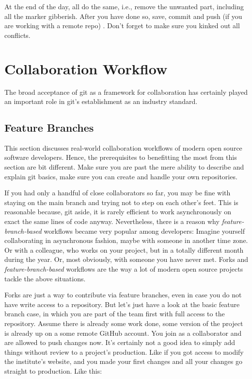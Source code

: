 \documentclass[
  12pt,
  letterpaper,
]{krantz}
\begin{document}
At the end of the day, all do the same, i.e., remove the unwanted part,
including all the marker gibberish. After you have done so, save, commit
and push (if you are working with a remote repo) . Don't forget to make
sure you kinked out all conflicts.

\hypertarget{collaboration-workflow}{%
\section{Collaboration Workflow}\label{collaboration-workflow}}

The broad acceptance of git as a framework for collaboration has
certainly played an important role in git's establishment as an industry
standard.

\hypertarget{feature-branches}{%
\subsection{Feature Branches}\label{feature-branches}}

This section discusses real-world collaboration
workflows of modern open source software developers. Hence, the
prerequisites to benefitting the most from this section are bit
different. Make sure you are past the mere ability to describe and
explain git basics, make sure you can create and handle your own
repositories.

If you had only a handful of close collaborators so far, you may be fine
with staying on the main branch and trying not to step on each other's
feet. This is reasonable because, git aside, it is rarely efficient to
work asynchronously on exact the same lines of code anyway.
Nevertheless, there is a reason why
\emph{feature-branch-based} workflows became very
popular among developers: Imagine yourself collaborating in asynchronous
fashion, maybe with someone in another time zone. Or with a colleague,
who works on your project, but in a totally different month during the
year. Or, most obviously, with someone you have never met. Forks and
\emph{feature-branch-based} workflows are the way a lot of modern open
source projects tackle the above situations.

Forks are just a way to contribute via feature
branches, even in case you do not have write
access to a repository. But let's just have a look at the basic feature
branch case, in which you are part of the team first with full access to
the repository. Assume there is already some work done, some version of
the project is already up on a some remote GitHub account. You join as a
collaborator and are allowed to push changes now. It's certainly not a
good idea to simply add things without review to a project's production.
Like if you got access to modify the institute's website, and you made
your first changes and all your changes go straight to production. Like
this:
\end{document}
